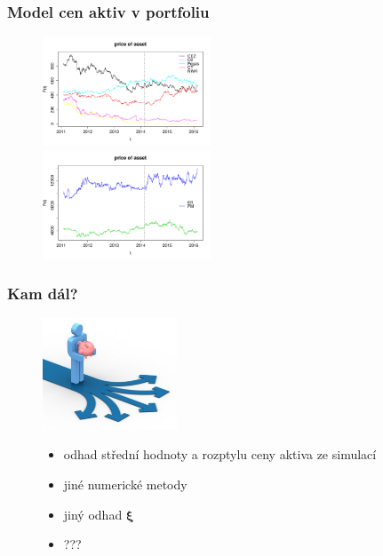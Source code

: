 \documentclass[xcolor=dvipsnames]{beamer}
\theoremstyle{definition} \newtheorem{definice}[veta]{Definice}
\theoremstyle{remark}
\begin{document}
\begin{frame}
  \frametitle{Model cen aktiv v portfoliu}
\begin{figure}[!htbp]
  \centering 
	\includegraphics[width=5cm, clip, trim= 0 15 25 50]{IMG/ds_price_of_asset_ostatni.pdf}\\[5mm]
	\includegraphics[width=5cm, clip, trim= 0 15 25 50]{IMG/ds_price_of_asset_KBPM_v2.pdf}	
\end{figure}  
\end{frame}

\begin{frame}
  \frametitle{Kam dál?}
\begin{figure}[h]
   \centering
   \begin{minipage}[c]{0.3\textwidth}
     \centering \includegraphics[width=4cm]{IMG/rozcesti.jpg}
   \end{minipage}
\hfill
   \begin{minipage}[c]{0.6\textwidth}
  \begin{itemize}
   \item odhad střední hodnoty a rozptylu ceny aktiva ze simulací
   \item jiné numerické metody  
   \item jiný odhad $\boldsymbol{\xi}$%
   \item ???
  \end{itemize}
   \end{minipage}	
   \end{figure}
\end{frame}
\end{document}
